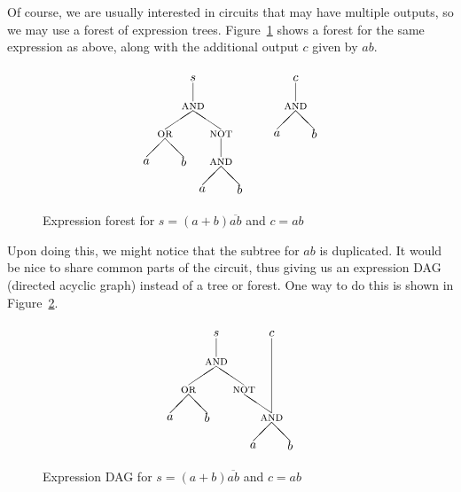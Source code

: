 Of course, we are usually interested in circuits that may have multiple outputs, so we may use a forest of expression trees. Figure~\ref{fig:exprforest} shows a forest for the same expression as above, along with the additional output $c$ given by $ab$.
\begin{figure}
\[ \setlength{\unitlength}{0.75pt}
\begin{picture}(200,140)
\put(10,40){\makebox(0,0){$a$}}
\put(50,40){\makebox(0,0){$b$}}
\put(30,70){\makebox(0,0){\textsc{or}}}
\put(10,45){\line(1,1){20}}
\put(50,45){\line(-1,1){20}}
\put(70,10){\makebox(0,0){$a$}}
\put(110,10){\makebox(0,0){$b$}}
\put(90,40){\makebox(0,0){\textsc{and}}}
\put(70,15){\line(1,1){20}}
\put(110,15){\line(-1,1){20}}
\put(90,70){\makebox(0,0){\textsc{not}}}
\put(90,45){\line(0,1){20}}
\put(60,100){\makebox(0,0){\textsc{and}}}
\put(30,75){\line(3,2){30}}
\put(90,75){\line(-3,2){30}}
\put(60,130){\makebox(0,0){$s$}}
\put(60,105){\line(0,1){20}}
\put(150,70){\makebox(0,0){$a$}}
\put(190,70){\makebox(0,0){$b$}}
\put(170,100){\makebox(0,0){\textsc{and}}}
\put(150,75){\line(1,1){20}}
\put(190,75){\line(-1,1){20}}
\put(170,130){\makebox(0,0){$c$}}
\put(170,105){\line(0,1){20}}
\end{picture} \]
\caption{Expression forest for $s=(a+b)\overline{ab}$ and $c=ab$}
\label{fig:exprforest}
\end{figure}

Upon doing this, we might notice that the subtree for $ab$ is duplicated. It would be nice to share common parts of the circuit, thus giving us an expression DAG (directed acyclic graph) instead of a tree or forest. One way to do this is shown in Figure~\ref{fig:exprdag1}.
\begin{figure}
\[ \setlength{\unitlength}{0.75pt}
\begin{picture}(150,140)
\put(10,40){\makebox(0,0){$a$}}
\put(50,40){\makebox(0,0){$b$}}
\put(30,70){\makebox(0,0){\textsc{or}}}
\put(10,45){\line(1,1){20}}
\put(50,45){\line(-1,1){20}}
\put(100,10){\makebox(0,0){$a$}}
\put(140,10){\makebox(0,0){$b$}}
\put(120,40){\makebox(0,0){\textsc{and}}}
\put(100,15){\line(1,1){20}}
\put(140,15){\line(-1,1){20}}
\put(90,70){\makebox(0,0){\textsc{not}}}
\put(120,45){\line(-3,2){30}}
\put(60,100){\makebox(0,0){\textsc{and}}}
\put(30,75){\line(3,2){30}}
\put(90,75){\line(-3,2){30}}
\put(60,130){\makebox(0,0){$s$}}
\put(60,105){\line(0,1){20}}
\put(120,130){\makebox(0,0){$c$}}
\put(120,45){\line(0,1){80}}
\end{picture} \]
\caption{Expression DAG for $s=(a+b)\overline{ab}$ and $c=ab$}
\label{fig:exprdag1}
\end{figure}

